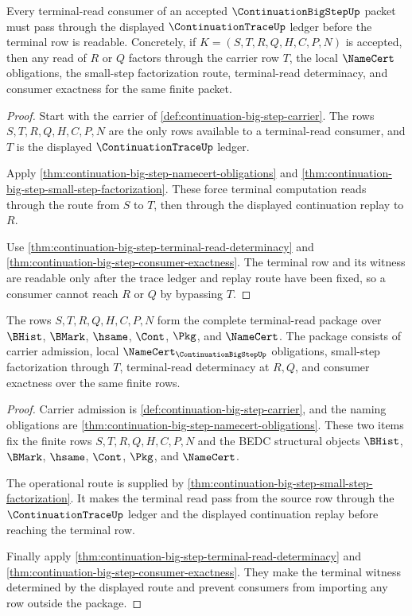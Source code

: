 \begin{theorem}
\label{thm:continuation-bigstep-trace-ledger-threshold}
Every terminal-read consumer of an accepted $\ContinuationBigStepUp$ packet must pass through the displayed $\ContinuationTraceUp$ ledger before the terminal row is readable. Concretely, if $K=(S,T,R,Q,H,C,P,N)$ is accepted, then any read of $R$ or $Q$ factors through the carrier row $T$, the local $\NameCert$ obligations, the small-step factorization route, terminal-read determinacy, and consumer exactness for the same finite packet.
\end{theorem}
\begin{proof}
Start with the carrier of \autoref{def:continuation-big-step-carrier}. The rows $S,T,R,Q,H,C,P,N$ are the only rows available to a terminal-read consumer, and $T$ is the displayed $\ContinuationTraceUp$ ledger.

Apply \autoref{thm:continuation-big-step-namecert-obligations} and \autoref{thm:continuation-big-step-small-step-factorization}. These force terminal computation reads through the route from $S$ to $T$, then through the displayed continuation replay to $R$.

Use \autoref{thm:continuation-big-step-terminal-read-determinacy} and \autoref{thm:continuation-big-step-consumer-exactness}. The terminal row and its witness are readable only after the trace ledger and replay route have been fixed, so a consumer cannot reach $R$ or $Q$ by bypassing $T$.
\end{proof}

\begin{theorem}
\label{thm:continuation-bigstep-terminal-consumer-package}
The rows $S,T,R,Q,H,C,P,N$ form the complete terminal-read package over $\BHist$, $\BMark$, $\hsame$, $\Cont$, $\Pkg$, and $\NameCert$. The package consists of carrier admission, local $\NameCert_{\ContinuationBigStepUp}$ obligations, small-step factorization through $T$, terminal-read determinacy at $R,Q$, and consumer exactness over the same finite rows.
\end{theorem}
\begin{proof}
Carrier admission is \autoref{def:continuation-big-step-carrier}, and the naming obligations are \autoref{thm:continuation-big-step-namecert-obligations}. These two items fix the finite rows $S,T,R,Q,H,C,P,N$ and the BEDC structural objects $\BHist$, $\BMark$, $\hsame$, $\Cont$, $\Pkg$, and $\NameCert$.

The operational route is supplied by \autoref{thm:continuation-big-step-small-step-factorization}. It makes the terminal read pass from the source row through the $\ContinuationTraceUp$ ledger and the displayed continuation replay before reaching the terminal row.

Finally apply \autoref{thm:continuation-big-step-terminal-read-determinacy} and \autoref{thm:continuation-big-step-consumer-exactness}. They make the terminal witness determined by the displayed route and prevent consumers from importing any row outside the package.
\end{proof}

